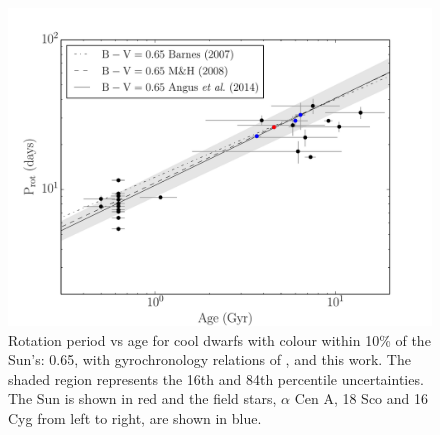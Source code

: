 \documentclass[11pt,preprint]{aastex}
\begin{document}
\begin{figure}[ht]
\begin{center}
\includegraphics[width=6in, clip=true, trim=0 0 0.5in 0]{p_vs_a_solar.pdf}
\caption{Rotation period vs age for cool dwarfs with colour within 10\% of the
	Sun's: 0.65, with gyrochronology relations of \citet{Barnes2007},
	\citet{Mamajek2008} and this work. The shaded region represents the
	16th and 84th percentile uncertainties. The Sun is shown in red and the
	field stars, $\alpha$ Cen A, 18 Sco and 16 Cyg from left to right, are
	shown in blue.
\label{fig:p_vs_a_solar}}
\end{center}
\end{figure}
\end{document}
